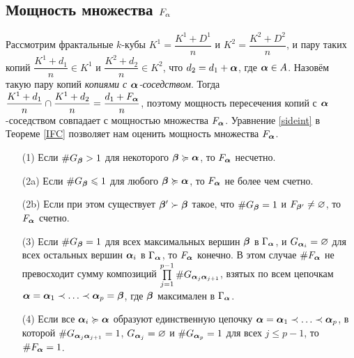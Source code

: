 \subsection{Мощность множества $F_\alpha$}

Рассмотрим фрактальные $k$-кубы $K^1=\dfrac{K^1+D^1}{n}$ и  $K^2=\dfrac{K^2+D^2}{n}$, и пару таких копий $\dfrac{K^1+d_1}{n}\in K^1$ и $\dfrac{K^2+d_2}{n}\in K^2$, что $d_2=d_1+{\bm{\alpha}}$, где ${\bm{\alpha}}\in A$.
Назовём такую пару копий {\em копиями с ${\bm{\alpha}}$-соседством}.
Тогда $\dfrac{K^1+d_1}{n}\cap\dfrac{K^1+d_2}{n}=\dfrac{d_1+F_{\bm{\alpha}}}{n}$, поэтому мощность пересечения копий с ${\bm{\alpha}}$-соседством совпадает с мощностью множества $F_{\bm{\alpha}}$.
Уравнение \eqref{sideint} в Теореме \ref{IFC} позволяет нам оценить мощность множества $F_{\bm{\alpha}}$.

\begin{theorem}\label{fin_int}
\qquad
\begin{enumerate}[nolistsep]
\item[(1)] Если $\#G_{\bm{\beta}}>1$ для некоторого ${\bm{\beta}}\succcurlyeq{\bm{\alpha}}$, то  $F_{\bm{\alpha}}$ несчетно.

\item[(2a)] Если  $\#G_{\bm{\beta}}\leqslant1$ для любого ${\bm{\beta}}\succcurlyeq{\bm{\alpha}}$, то  $F_{\bm{\alpha}}$ не более чем счетно.


\item[(2b)] Если при этом существует ${\bm{\beta}}'\succ{\bm{\beta}}$ такое, что $\#G_{\bm{\beta}}=1$ и $F_{{\bm{\beta}}'}\neq\varnothing$, то $F_{\bm{\alpha}}$ счетно.

\item[(3)] Если  $\#G_{\bm{\beta}}=1$ для всех максимальных вершин ${\bm{\beta}}$ в $\Gamma_{\bm{\alpha}}$, и $G_{{\bm{\alpha}}_i}=\varnothing$ для всех остальных вершин ${\bm{\alpha}}_i$ в $\Gamma_{\bm{\alpha}}$, то $F_{\bm{\alpha}}$ конечно.
В этом случае $\#F_{\bm{\alpha}}$ не превосходит сумму   композиций $\prod \limits_{j=1}^{p-1}\# G_{{\bm{\alpha}}_j{\bm{\alpha}}_{j+1}}$, взятых по всем цепочкам ${\bm{\alpha}}={\bm{\alpha}}_1\prec\ldots\prec{\bm{\alpha}}_p={\bm{\beta}}$, где ${\bm{\beta}}$  максимален в $\Gamma_{\bm{\alpha}}$.

\item[(4)] Если все ${\bm{\alpha}}_i\succcurlyeq{\bm{\alpha}}$ образуют единственную цепочку ${\bm{\alpha}}={\bm{\alpha}}_1\prec\ldots\prec{\bm{\alpha}}_p$, в которой  $\# G_{{\bm{\alpha}}_j{\bm{\alpha}}_{j+1}}=1$, $G_{{\bm{\alpha}}_j}=\varnothing$ и $\#G_{{\bm{\alpha}}_p}=1$ для всех $j\le p-1$, то  $\#F_{\bm{\alpha}}=1$.
\end{enumerate}
\end{theorem}


